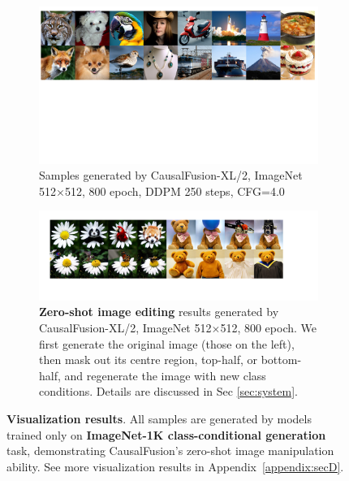 \begin{figure}[t]
  \centering
  \begin{subfigure}{1.0\linewidth}
    \centering
    \includegraphics[width=\linewidth]{figs/figure2.pdf}
    \caption{Samples generated by CausalFusion-XL/2, ImageNet 512$\times$512, 800 epoch, DDPM 250 steps, CFG=4.0}
  \end{subfigure}
  \begin{subfigure}{1.0\linewidth}
    \centering
    \includegraphics[width=\linewidth]{figs/edit.pdf}
    \caption{\textbf{Zero-shot image editing} results generated by CausalFusion-XL/2, ImageNet 512$\times$512, 800 epoch. We first generate the original image (those on the left), then mask out its centre region, top-half, or bottom-half, and regenerate the image with new class conditions. Details are discussed in Sec \ref{sec:system}.}
  \end{subfigure}
  \caption{\textbf{Visualization results}. All samples are generated by models trained only on \textbf{ImageNet-1K class-conditional generation} task, demonstrating CausalFusion's zero-shot image manipulation ability. See more visualization results in Appendix~\ref{appendix:secD}.
  \vspace{-12pt}
  }
  \vspace{-6pt}
  \label{fig:vis1}
\end{figure}

